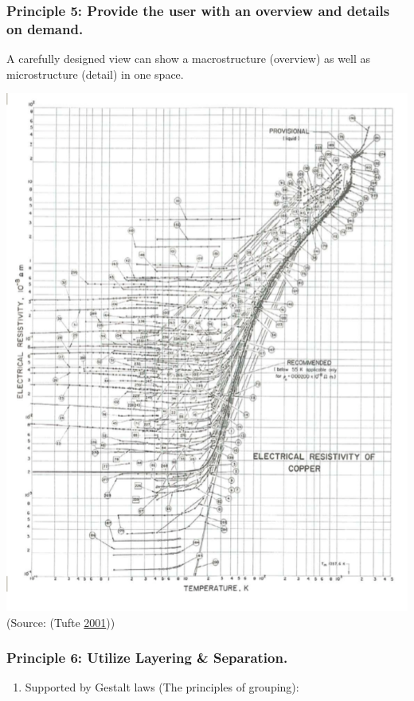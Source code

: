 \documentclass[]{book}
\providecommand{\tightlist}{%
  \setlength{\itemsep}{0pt}\setlength{\parskip}{0pt}}
\theoremstyle{definition}
\theoremstyle{definition}
\theoremstyle{definition}
\theoremstyle{remark}
\begin{document}
\subsubsection{Principle 5: Provide the user with an overview and
details on
demand.}\label{principle-5-provide-the-user-with-an-overview-and-details-on-demand.}

A carefully designed view can show a macrostructure (overview) as well
as microstructure (detail) in one space.

\includegraphics{images/Tufte_figure9.png} (Source: (Tufte
\protect\hyperlink{ref-Tufte_2001}{2001}))

\subsubsection{Principle 6: Utilize Layering \&
Separation.}\label{principle-6-utilize-layering-separation.}

\begin{enumerate}
\def\labelenumi{\arabic{enumi}.}
\tightlist
\item
  Supported by Gestalt laws (The principles of grouping):
\end{enumerate}
\end{document}
